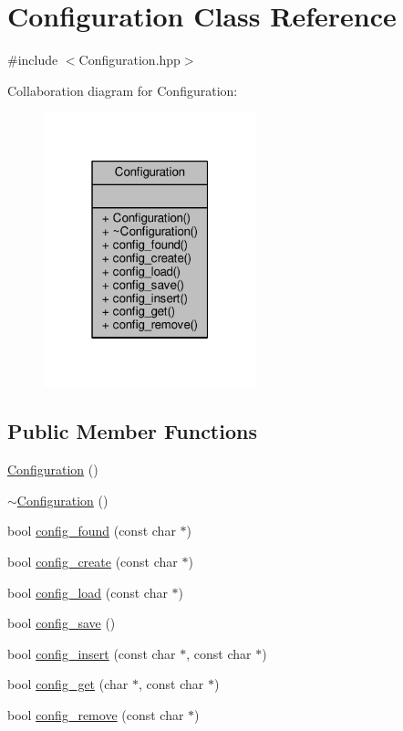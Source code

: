 \hypertarget{class_configuration}{}\section{Configuration Class Reference}
\label{class_configuration}


{\ttfamily \#include $<$Configuration.\+hpp$>$}



Collaboration diagram for Configuration\+:\nopagebreak
\begin{figure}[H]
\begin{center}
\leavevmode
\includegraphics[width=175pt]{class_configuration__coll__graph}
\end{center}
\end{figure}
\subsection*{Public Member Functions}
\begin{DoxyCompactItemize}
\item 
\hyperlink{class_configuration_a779947337bf652f0e773cb29f37f14ba}{Configuration} ()
\item 
\hyperlink{class_configuration_a0dd0fa189e239f4c9a036303f641441e}{$\sim$\+Configuration} ()
\item 
bool \hyperlink{class_configuration_a9eb938cc99deddd6b9730ee10576b55a}{config\+\_\+found} (const char $\ast$)
\item 
bool \hyperlink{class_configuration_a19490e0e191f69330f1f3efa988ed99a}{config\+\_\+create} (const char $\ast$)
\item 
bool \hyperlink{class_configuration_aed21dbeb0bcb1de61389deee612d9074}{config\+\_\+load} (const char $\ast$)
\item 
bool \hyperlink{class_configuration_aea42a72a64052e67db46c0369d731a5e}{config\+\_\+save} ()
\item 
bool \hyperlink{class_configuration_aa73dc1019f3fe1678ff56321d2e32960}{config\+\_\+insert} (const char $\ast$, const char $\ast$)
\item 
bool \hyperlink{class_configuration_a8a66e437127dfe28d70690d53f6dfd7f}{config\+\_\+get} (char $\ast$, const char $\ast$)
\item 
bool \hyperlink{class_configuration_a971a8c8fdd4e21f63c76e21ce19d7b61}{config\+\_\+remove} (const char $\ast$)
\end{DoxyCompactItemize}


